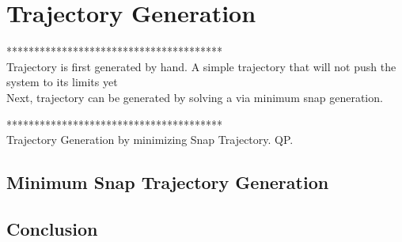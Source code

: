 \chapter{Trajectory Generation}\label{ch:trajectory}

***************************************\\
Trajectory is first generated by hand. A simple trajectory that will not push the system to its limits yet\\
Next, trajectory can be generated by solving a  via minimum snap generation.

***************************************\\

Trajectory Generation by minimizing Snap Trajectory. QP.\\

\section{Minimum Snap Trajectory Generation}


\section{Conclusion}

